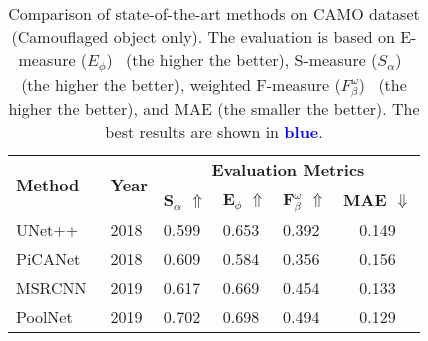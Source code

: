 \documentclass[journal]{IEEEtran}
\begin{document}
\begin{table}[!t]
\centering
	\caption{Comparison of state-of-the-art methods on CAMO dataset (Camouflaged object only). The evaluation is based on  E-measure ($E_{\phi}$)~\cite{ephi} (the higher the better), S-measure ($S_{\alpha}$)~\cite{smeasure} (the higher the better), weighted F-measure ($F_{\beta}^{\omega}$)~\cite{weightedf} (the higher the better), and MAE (the smaller the better). The best results are shown in \textcolor{blue}{\textbf{blue}}.}
\label{tab:sinet}
\footnotesize
\begin{tabular}{|l|l|cccc|}
\toprule
\multirow{2}{*}{\textbf{Method}}
 & \multirow{2}{*}{\textbf{Year}} &
 \multicolumn{4}{c|}{\textbf{Evaluation Metrics}} \\
 \cmidrule{3-6}
 & &
 \multicolumn{1}{c|}{\textbf{S$_{\alpha}$} $\Uparrow$}                            & \multicolumn{1}{c|}{\textbf{E$_{\phi}$} $\Uparrow$}                            & \multicolumn{1}{c|}{\textbf{F$_{\beta}^{\omega}$} $\Uparrow$}                            & \multicolumn{1}{c|}{\textbf{MAE $\Downarrow$}}                            \\ \midrule
\multicolumn{1}{|l|}{UNet++~\cite{unet}}           & \multicolumn{1}{l|}{2018}          & \multicolumn{1}{l|}{0.599}                                 & \multicolumn{1}{l|}{0.653}                                 & \multicolumn{1}{l|}{0.392}                                 & \multicolumn{1}{c|}{0.149}                                 \\ \midrule
\multicolumn{1}{|l|}{PiCANet~\cite{picanet}}          & \multicolumn{1}{l|}{2018}          & \multicolumn{1}{l|}{0.609}                                 & \multicolumn{1}{l|}{0.584}                                 & \multicolumn{1}{l|}{0.356}                                 & \multicolumn{1}{c|}{0.156}                                 \\ \midrule
\multicolumn{1}{|l|}{MSRCNN~\cite{maskscore}}           & \multicolumn{1}{l|}{2019}          & \multicolumn{1}{l|}{0.617}                                 & \multicolumn{1}{l|}{0.669}                                 & \multicolumn{1}{l|}{0.454}                                 & \multicolumn{1}{c|}{0.133}                                 \\ \midrule
\multicolumn{1}{|l|}{PoolNet~\cite{poolnet}}          & \multicolumn{1}{l|}{2019}          & \multicolumn{1}{l|}{0.702}                                 & \multicolumn{1}{l|}{0.698}                                 & \multicolumn{1}{l|}{0.494}                                 & \multicolumn{1}{c|}{0.129}                                 \\ \hline

\end{tabular}
\end{table}
\end{document}
